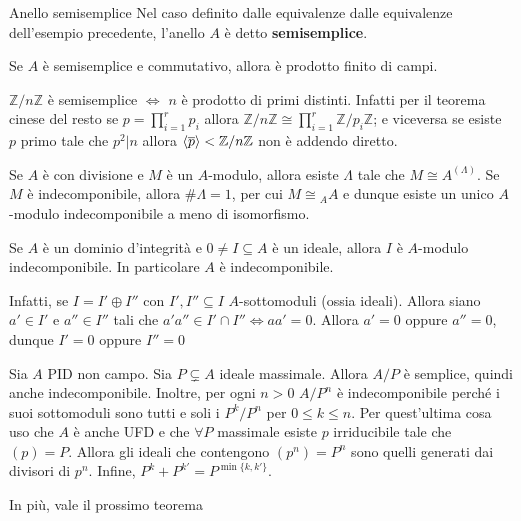 \begin{definition}{Anello semisemplice}
    Nel caso definito dalle equivalenze dalle equivalenze dell'esempio
    precedente, l'anello \(A\) è detto \textbf{semisemplice}.
\end{definition}

\begin{remark}{}
    Se \(A\) è semisemplice e commutativo, allora è prodotto finito di campi.
\end{remark}
\begin{example}{}
    \(\mathbb{Z} / n \mathbb{Z}\) è semisemplice \(\iff\) \(n\) è prodotto di
    primi distinti. Infatti per il teorema cinese del resto se \(p =
    \prod_{i=1}^{r}p_i\) allora \(\mathbb{Z} / n \mathbb{Z} \cong
    \prod_{i=1}^{r} \mathbb{Z} / p_i \mathbb{Z} \); e viceversa se esiste \(p\)
    primo tale che \(p^2 | n\) allora \({\left\langle\overline{p}\right\rangle} < \mathbb{Z} / n
    \mathbb{Z}\) non è addendo diretto.
\end{example}

\begin{example}{}
    Se \(A\) è con divisione e \(M\) è un \(A\)-modulo, allora esiste
    \(\Lambda\) tale che \(M \cong A^{{(\Lambda)}}\). Se \(M\) è
    indecomponibile, allora \(\# \Lambda = 1\), per cui \(M \cong {}_AA\) e
    dunque esiste un unico \(A\)-modulo indecomponibile a meno di isomorfismo.
\end{example}

\begin{example}{}
    Se \(A\) è un dominio d'integrità e \(0 \neq I \subseteq A \) è un ideale,
    allora \(I\) è \(A\)-modulo indecomponibile. In particolare \(A\) è
    indecomponibile.

    Infatti, se \(I = I' \oplus I''\) con \(I', I'' \subseteq I \)
    \(A\)-sottomoduli (ossia ideali). Allora siano \(a' \in I'\) e \(a'' \in 
    I''\) tali che \(a' a'' \in I' \cap I'' \iff a a' = 0\). Allora \(a' = 0\)
    oppure \(a'' = 0\), dunque \(I' = 0\) oppure \(I'' = 0\) 
\end{example}

\begin{example}{}
    Sia \(A\) PID non campo. Sia \(P \subsetneq A \) ideale massimale. Allora
    \(A / P\) è semplice, quindi anche indecomponibile. Inoltre, per ogni \(n >
    0\) \(A / P^{n}\) è indecomponibile perché i suoi sottomoduli sono tutti e
    soli i \(P^{k} / P^{n}\) per \(0 \le k\le n\). Per quest'ultima cosa uso
    che \(A\) è anche UFD e che \(\forall P \) massimale esiste \(p\)
    irriducibile tale che \({(p)} = P\). Allora gli ideali che contengono
    \({(p^{n})} = P^{n}\) sono quelli generati dai divisori di \(p^{n}\).
    Infine, \(P^{k} + P^{k'} = P^{\min \{ k, k'\} }\).

    In più, vale il prossimo teorema
\end{example}

